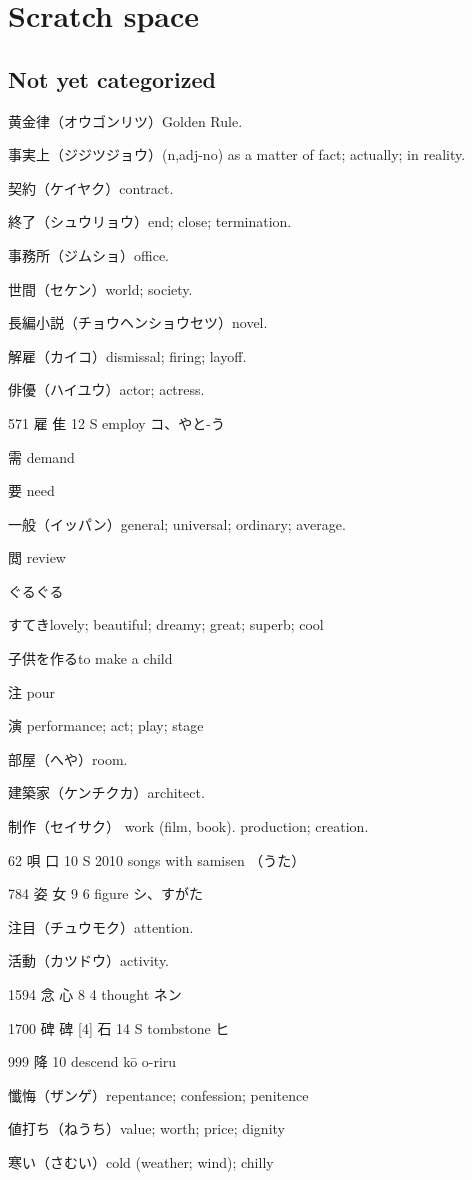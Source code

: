 \chapter{Scratch space}

\section{Not yet categorized}

黄金律（オウゴンリツ）Golden Rule.

事実上（ジジツジョウ）(n,adj-no)
as a matter of fact; actually; in reality.

契約（ケイヤク）contract.

終了（シュウリョウ）end; close; termination.

事務所（ジムショ）office.

世間（セケン）world; society.

長編小説（チョウヘンショウセツ）novel.

解雇（カイコ）dismissal; firing; layoff.

俳優（ハイユウ）actor; actress.

571	雇		隹	12	S		employ	コ、やと-う

需 demand

要 need

一般（イッパン）general; universal; ordinary; average.

閲 review

ぐるぐる

すてきlovely; beautiful; dreamy; great; superb; cool


子供を作るto make a child

注 pour

演 performance; act; play; stage

部屋（へや）room.

建築家（ケンチクカ）architect.

制作（セイサク）
work (film, book).
production; creation.

62	唄		口	10	S	2010	songs with samisen	（うた）

784	姿		女	9	6		figure	シ、すがた

注目（チュウモク）attention.

活動（カツドウ）activity.

1594	念		心	8	4		thought	ネン

1700	碑	碑 [4]	石	14	S		tombstone	ヒ

999	降	10	descend	kō	o-riru

懺悔（ザンゲ）repentance; confession; penitence

値打ち（ねうち）value; worth; price; dignity

寒い（さむい）cold (weather; wind); chilly
